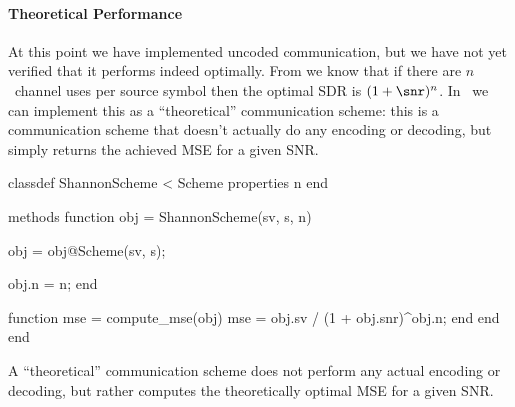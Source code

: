 \paragraph{Theoretical Performance}

At this point we have implemented uncoded communication, but we have not
yet verified that it performs indeed optimally. From  we know
that if there are $n$~channel uses per source symbol then the optimal SDR
is $(1 + \snr)^n$. In \jscsim\ we can implement this as a ``theoretical''
communication scheme: this is a communication scheme that doesn't actually do
any encoding or decoding, but simply returns the achieved MSE for a given SNR.

\begin{listing}
\begin{Code}
  classdef ShannonScheme < Scheme
    properties
      n         %
    end

    methods
      function obj = ShannonScheme(sv, s, n)
        
        obj = obj@Scheme(sv, s);

        obj.n = n;
      end

      function mse = compute_mse(obj)
        mse = obj.sv / (1 + obj.snr)^obj.n;
      end
    end
  end
\end{Code}
  \caption{A ``theoretical'' communication scheme does not perform any
  actual encoding or decoding, but rather computes the theoretically optimal MSE
  for a given SNR.}
  \label{lst:shannonscheme}
\end{listing}

